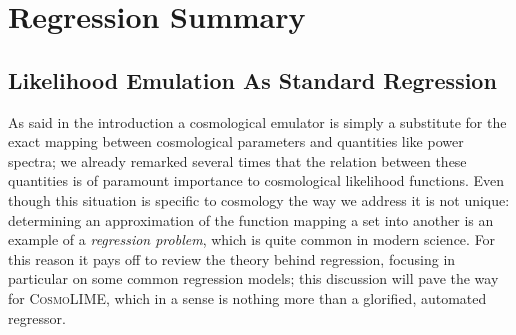 \chapter{Regression Summary}
\section{Likelihood Emulation As Standard Regression}\label{sec:emulation_as_regression}


As said in the introduction a cosmological emulator is simply a substitute for the exact mapping between cosmological parameters and quantities like power spectra; we already remarked several times that the relation between these quantities is of paramount importance to cosmological likelihood functions. Even though this situation is specific to cosmology the way we address it is not unique: determining an approximation of the function mapping a set into another is an example of a \emph{regression problem}, which is quite common in modern science. For this reason it pays off to review the theory behind regression, focusing in particular on some common regression models; this discussion will pave the way for \textsc{CosmoLIME}, which in a sense is nothing more than a glorified, automated regressor.

